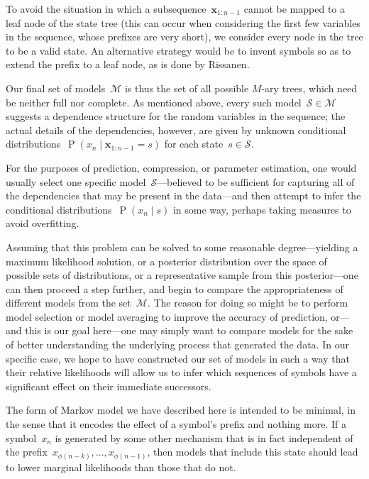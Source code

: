 \documentclass[12pt,a4paper]{article}
\newcommand\mc[1]{\mathcal{#1}}               %
\newcommand\ub[1]{\symbf{#1}}                 %
\DeclareMathOperator\Pb{P}                    %
\begin{document}
To avoid the situation in which a subsequence~\(\ub{x}_{1:n-1}\) cannot be
mapped to a leaf node of the state tree (this can occur when considering the
first few variables in the sequence, whose prefixes are very short), we consider
every node in the tree to be a valid state. An alternative strategy would be to
invent symbols so as to extend the prefix to a leaf node, as is done by
Rissanen.

Our final set of models~\(\mc{M}\) is thus the set of all possible \(M\)-ary
trees, which need be neither full nor complete. As mentioned above, every such
model~\(\mc{S} \in \mc{M}\) suggests a dependence structure for the random
variables in the sequence; the actual details of the dependencies, however, are
given by unknown conditional distributions~\(\Pb(x_n \mid \ub{x}_{1:n-1} = s)\)
for each state~\(s \in \mc{S}\).

For the purposes of prediction, compression, or parameter estimation, one would
usually select one specific model~\(\mc{S}\)---believed to be sufficient for
capturing all of the dependencies that may be present in the data---and then
attempt to infer the conditional distributions~\(\Pb(x_n \mid s)\) in some way,
perhaps taking measures to avoid overfitting.

Assuming that this problem can be solved to some reasonable degree---yielding a
maximum likelihood solution, or a posterior distribution over the space of
possible sets of distributions, or a representative sample from this
posterior---one can then proceed a step further, and begin to compare the
appropriateness of different models from the set~\(\mc{M}\). The reason for
doing so might be to perform model selection or model averaging to improve the
accuracy of prediction, or---and this is our goal here---one may simply want to
compare models for the sake of better understanding the underlying process that
generated the data. In our specific case, we hope to have constructed our set of
models in such a way that their relative likelihoods will allow us to infer
which sequences of symbols have a significant effect on their immediate
successors.

The form of Markov model we have described here is intended to be minimal, in
the sense that it encodes the effect of a symbol's prefix and nothing more. If a
symbol~\(x_n\) is generated by some other mechanism that is in fact independent
of the prefix~\(x_{\phi(n-k)}, \dots, x_{\phi(n-1)}\), then models that include
this state should lead to lower marginal likelihoods than those that do not.
\end{document}
